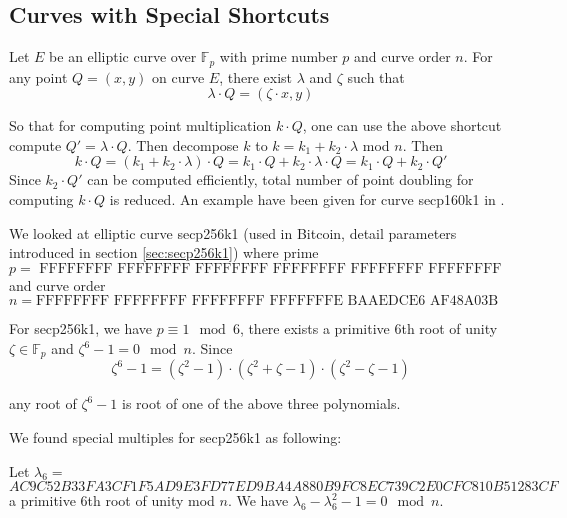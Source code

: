 \subsection{Curves with Special Shortcuts} \label {sec:shortcuts}

Let $E$ be an elliptic curve over $\mathbb{F}_p$ with prime number $p$ and curve order $n$. For any point $Q=(x,y)$ on curve $E$, there exist $\lambda$ and $\zeta$ such that $$\lambda \cdot Q = (\zeta \cdot x , y)$$

So that for computing point multiplication $k \cdot Q$, one can use the above shortcut compute $Q' = \lambda \cdot Q$. Then decompose $k$ to $k=k_1+k_2 \cdot \lambda$ mod $n$. Then $$k \cdot Q = (k_1 + k_2 \cdot \lambda)\cdot Q = k_1\cdot Q + k_2\cdot \lambda \cdot Q = k_1 \cdot Q + k_2 \cdot Q' $$ Since $k_2 \cdot Q'$ can be computed efficiently, total number of point doubling for computing $k\cdot Q$ is reduced. An example have been given for curve secp160k1 in \cite{hankerson2006guide}.

We looked at elliptic curve secp256k1 (used in Bitcoin, detail parameters introduced in section \ref{sec:secp256k1})  where prime $$p= \text{ FFFFFFFF FFFFFFFF FFFFFFFF FFFFFFFF FFFFFFFF FFFFFFFF FFFFFFFE FFFFFC2F}$$ and curve order $$ n = \text{FFFFFFFF FFFFFFFF FFFFFFFF FFFFFFFE BAAEDCE6 AF48A03B BFD25E8C D0364141}$$



For secp256k1, we have $p \equiv 1 \mod{6}$, there exists a primitive 6th root of unity $\zeta \in \mathbb{F}_p$ and  $\zeta^6 - 1 = 0 \mod{n}$. Since $$\zeta^6 - 1 = (\zeta^2-1)\cdot(\zeta^2+\zeta - 1)\cdot (\zeta^2-\zeta -1)$$ 

any root of $\zeta^6-1$ is root of one of the above three polynomials. 

We found special multiples for secp256k1 as following: 

Let
$\lambda_6 =$\\
$AC9C52B33FA3CF1F5AD9E3FD77ED9BA4A880B9FC8EC739C2E0CFC810B51283CF$
a primitive 6th root of unity mod $n$.
We have $\lambda_6-\lambda_6^2-1=0 \mod{n}$.
%
%

